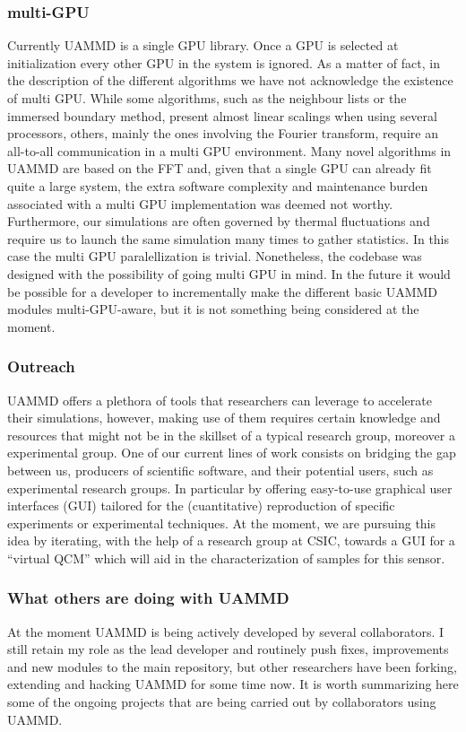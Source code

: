 \documentclass[ twoside,openright,titlepage,numbers=noenddot,%
headinclude,footinclude,cleardoublepage=empty,abstract=on,
BCOR=5mm,paper=a4,fontsize=11pt, dvipsnames
]{scrreprt}
\begin{document}
\subsubsection*{multi-GPU}
Currently UAMMD is a single GPU library. Once a GPU is selected at initialization every other GPU in the system is ignored. As a matter of fact, in the description of the different algorithms we have not acknowledge the existence of multi GPU. While some algorithms, such as the neighbour lists or the immersed boundary method, present almost linear scalings when using several processors, others, mainly the ones involving the Fourier transform, require an all-to-all communication in a multi GPU environment. Many novel algorithms in UAMMD are based on the \gls{FFT} and, given that a single GPU can already fit quite a large system, the extra software complexity and maintenance burden associated with a multi GPU implementation was deemed not worthy. Furthermore, our simulations are often governed by thermal fluctuations and require us to launch the same simulation many times to gather statistics. In this case the multi GPU paralellization is trivial. Nonetheless, the codebase was designed with the possibility of going multi GPU in mind. In the future it would be possible for a developer to incrementally make the different basic UAMMD modules multi-GPU-aware, but it is not something being considered at the moment.
\subsubsection*{Outreach}
UAMMD offers a plethora of tools that researchers can leverage to accelerate their simulations, however, making use of them requires certain knowledge and resources that might not be in the skillset of a typical research group, moreover a experimental group. One of our current lines of work consists on bridging the gap between us, producers of scientific software, and their potential users, such as experimental research groups. In particular by offering easy-to-use graphical user interfaces (GUI) tailored for the (cuantitative) reproduction of specific experiments or experimental techniques. At the moment, we are pursuing this idea by iterating, with the help of a research group at CSIC, towards a GUI for a ``virtual QCM'' which will aid in the characterization of samples for this sensor.

\subsubsection*{What others are doing with UAMMD}
At the moment UAMMD is being actively developed by several collaborators. I still retain my role as the lead developer and routinely push fixes, improvements and new modules to the main repository, but other researchers have been forking, extending and hacking UAMMD for some time now. It is worth summarizing here some of the ongoing projects that are being carried out by collaborators using UAMMD.
\end{document}
